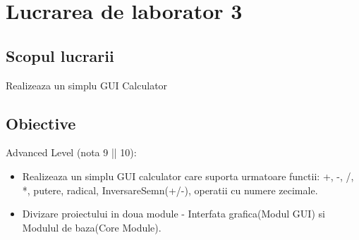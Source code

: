 \section{Lucrarea de laborator 3}

\subsection{Scopul lucrarii}

	Realizeaza un simplu GUI Calculator\
	
\subsection{Obiective}
Advanced Level (nota 9 || 10):
\begin{itemize}
		\item Realizeaza un simplu GUI calculator care suporta urmatoare functii: +, -, /, *, putere, radical, InversareSemn(+/-), operatii cu numere zecimale.
		\item Divizare proiectului in doua module - Interfata grafica(Modul GUI) si Modulul de baza(Core Module). 
\end{itemize}